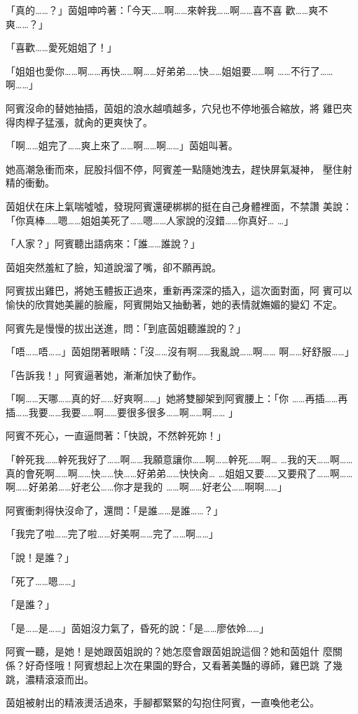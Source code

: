 「真的……？」茵姐呻吟著：「今天……啊……來幹我……啊……喜不喜
歡……爽不爽……？」

「喜歡……愛死姐姐了！」

「姐姐也愛你……啊……再快……啊……好弟弟……快……姐姐要……啊
……不行了……啊……」

阿賓沒命的替她抽插，茵姐的浪水越噴越多，穴兒也不停地張合縮放，將
雞巴夾得肉桿子猛漲，就肏的更爽快了。

「啊……姐完了……爽上來了……啊……啊……」茵姐叫著。

她高潮急衝而來，屁股抖個不停，阿賓差一點隨她洩去，趕快屏氣凝神，
壓住射精的衝動。

茵姐伏在床上氣喘噓噓，發現阿賓還硬梆梆的挺在自己身體裡面，不禁讚
美說：「你真棒……嗯……姐姐美死了……嗯……人家說的沒錯……你真好…
…」

「人家？」阿賓聽出語病來：「誰……誰說？」

茵姐突然羞紅了臉，知道說溜了嘴，卻不願再說。

阿賓拔出雞巴，將她玉體扳正過來，重新再深深的插入，這次面對面，阿
賓可以愉快的欣賞她美麗的臉龐，阿賓開始又抽動著，她的表情就嫵媚的變幻
不定。

阿賓先是慢慢的拔出送進，問：「到底茵姐聽誰說的？」

「唔……唔……」茵姐閉著眼睛：「沒……沒有啊……我亂說……啊……
啊……好舒服……」

「告訴我！」阿賓逼著她，漸漸加快了動作。

「啊……天哪……真的好……好爽啊……」她將雙腳架到阿賓腰上：「你
……再插……再插……我要……我要……啊……要很多很多……啊……啊……
」

阿賓不死心，一直逼問著：「快說，不然幹死妳！」

「幹死我……幹死我好了……啊……我願意讓你……啊……幹死……啊…
…我的天……啊……真的會死啊……啊……快……快……好弟弟……快快肏…
…姐姐又要……又要飛了……啊……啊……好弟弟……好老公……你才是我的
……啊……好老公……啊啊……」

阿賓衝刺得快沒命了，還問：「是誰……是誰……？」

「我完了啦……完了啦……好美啊……完了……啊……」

「說！是誰？」

「死了……嗯……」

「是誰？」

「是……是……」茵姐沒力氣了，昏死的說：「是……廖依姈……」

阿賓一聽，是她！是她跟茵姐說的？她怎麼會跟茵姐說這個？她和茵姐什
麼關係？好奇怪哦！阿賓想起上次在果園的野合，又看著美豔的導師，雞巴跳
了幾跳，濃精滾滾而出。

茵姐被射出的精液燙活過來，手腳都緊緊的勾抱住阿賓，一直喚他老公。

